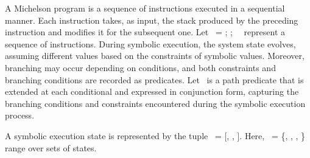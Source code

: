 \documentclass[a4paper,USenglish,cleveref, autoref, thm-restate]{lipics-v2021}
\begin{document}
A Michelson program is a sequence of instructions executed in a sequential manner. Each instruction takes, as input, the stack produced by the preceding instruction and modifies it for the subsequent one. Let \INSTRUCTION\ = \InstructionOne; \InstructionTwo; \DOT\  \InstructionN\ represent a sequence of instructions.
During symbolic execution,  the system state evolves, assuming different values based on the constraints of symbolic values. Moreover, branching may occur depending on conditions, and both constraints and branching conditions are recorded as predicates. Let \PREDICATE\ is a path predicate that is extended at each conditional and expressed in conjunction form, capturing the branching conditions and constraints encountered during the symbolic execution process.
\begin{definition}
A symbolic execution state is represented by the tuple \STATE\ = [\INSTRUCTION, \STACK, \PREDICATE]. Here, \SYSTEM\ = \{\STATEONE, \STATETWO, \DOT, \STATEN \} range over sets of  states.
\end{definition}
\end{document}
